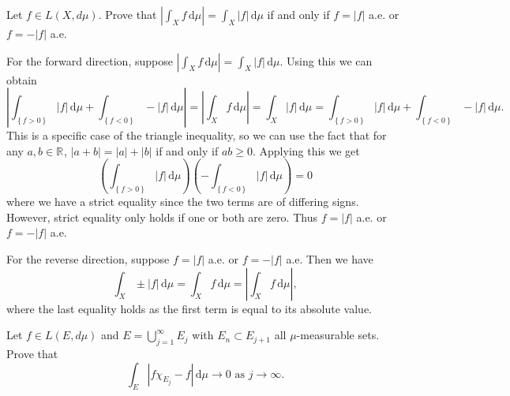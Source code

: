 \pagebreak

\begin{problem}{3}
  Let $f \in L\left( X,d \mu \right)$. Prove that $\left| \int_{X} \! f \, \mathrm{d}\mu  \right| = \int_{X} \! \left| f \right| \, \mathrm{d}\mu $ if and only if $f = \left| f \right|$ a.e. or $f = - \left| f \right|$ a.e.
\end{problem}

\begin{solution}
  For the forward direction, suppose $\left| \int_{X} \! f \, \mathrm{d}\mu  \right| = \int_{X} \! \left| f \right| \, \mathrm{d}\mu $.
  Using this we can obtain
  \[
  \left| \int_{\left\{ f > 0 \right\}} \! \left| f \right| \, \mathrm{d} \mu + \int_{\left\{ f < 0 \right\}} \! - \left| f \right| \, \mathrm{d} \mu  \right| = \left| \int_{X} \! f \, \mathrm{d} \mu  \right| = \int_{X} \! \left| f \right| \, \mathrm{d} \mu =  \int_{\left\{ f > 0 \right\}} \! \left| f \right| \, \mathrm{d} \mu + \int_{\left\{ f < 0 \right\}} \! - \left| f \right| \, \mathrm{d} \mu
  .\] 
  This is a specific case of the triangle inequality, so we can use the fact that for any $a,b \in \mathbb{R}^{}$, $\left| a + b \right| = \left| a \right| + \left| b \right|$ if and only if $ab \geq 0$.
  Applying this we get
  \[
  \left( \int_{\left\{ f > 0 \right\}} \! \left| f \right| \, \mathrm{d} \mu  \right) \left( - \int_{\left\{ f < 0 \right\}} \! \left| f \right| \, \mathrm{d} \mu \right) = 0
  \] 
  where we have a strict equality since the two terms are of differing signs.
  However, strict equality only holds if one or both are zero.
  Thus $f = \left| f \right|$ a.e. or $f = - \left| f \right|$ a.e.

  For the reverse direction, suppose $f = \left| f \right|$ a.e. or $f = - \left| f \right|$ a.e.
  Then we have
  \[
  \int_{X} \! \pm \left| f \right| \, \mathrm{d} \mu = \int_{X} \! f \, \mathrm{d} \mu = \left| \int_{X} \! f \, \mathrm{d} \mu  \right|
  ,\]
  where the last equality holds as the first term is equal to its absolute value.
\end{solution}

\pagebreak

\begin{problem}{4}
  Let $f \in L\left( E, d \mu \right)$ and $E = \bigcup_{j=1}^{\infty} E_{j} $ with $E_{n} \subset E_{j+1}$ all $\mu$-measurable sets.
  Prove that
  \[
  \int_{E} \! \left| f \chi_{E_{j}} - f \right| \, \mathrm{d} \mu \to 0 \text{ as } j \to \infty
  .\] 
\end{problem}


